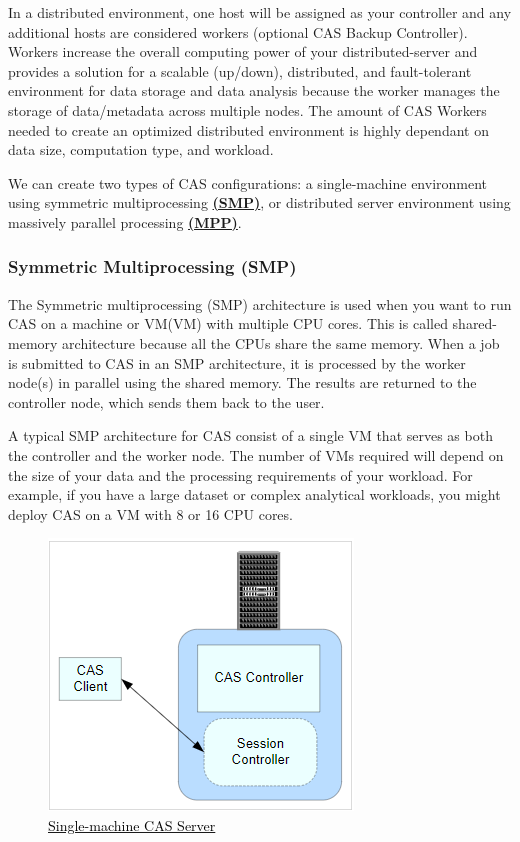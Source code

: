 In a distributed environment, one host will be assigned as your controller and any additional hosts are considered workers (optional CAS Backup Controller). Workers increase the overall computing power of your distributed-server and provides a solution for a scalable (up/down), distributed, and fault-tolerant environment for data storage and data analysis because the worker manages the storage of data/metadata across multiple nodes. The amount of CAS Workers needed to create an optimized distributed environment is highly dependant on data size, computation type, and workload.  

We can create two types of CAS configurations: a single-machine environment using symmetric multiprocessing \href{https://documentation.sas.com/doc/en/calcdc/3.3/calserverscas/n05000viyaservers000000admin.htm}{\textbf{(SMP)}}, or distributed server environment using massively parallel processing \href{https://documentation.sas.com/doc/en/calcdc/3.3/calserverscas/n05000viyaservers000000admin.htm}{\textbf{{(MPP)}}}.

\subsubsection{Symmetric Multiprocessing (SMP)}
The Symmetric multiprocessing (SMP) architecture is used when you want to run CAS on a machine or VM(VM) with multiple CPU cores. This is called shared-memory architecture because all the CPUs share the same memory. When a job is submitted to CAS in an SMP architecture, it is processed by the worker node(s) in parallel using the shared memory. The results are returned to the controller node, which sends them back to the user.

A typical SMP architecture for CAS consist of a single VM that serves as both the controller and the worker node. The number of VMs required will depend on the size of your data and the processing requirements of your workload. For example, if you have a large dataset or complex analytical workloads, you might deploy CAS on a VM with 8 or 16 CPU cores.

\begin{figure}[H]
    \centering
    \includegraphics[scale = 0.8]{images/smp_server.png}
    \caption{\href{https://documentation.sas.com/doc/en/calcdc/3.3/calserverscas/n05000viyaservers000000admin.htm}{\textcolor{black}{Single-machine CAS Server}}}
    \label{SMP Achitecture}
\end{figure}

